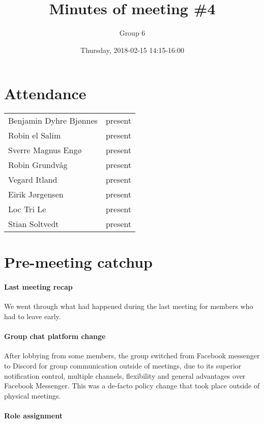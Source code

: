 \documentclass{article}
\title{Minutes of meeting \#4}
\author{Group 6}
\date{Thursday, 2018-02-15 14:15-16:00}
\begin{document}
\maketitle

\section{Attendance}
\begin{tabular}{l l}
    Benjamin Dyhre Bjønnes     & present \\
    Robin el Salim             & present \\
    Sverre Magnus Engø         & present \\
    Robin Grundvåg             & present \\
    Vegard Itland              & present \\
    Eirik Jørgensen            & present \\
    Loc Tri Le                 & present \\
    Stian Soltvedt             & present
\end{tabular}

\section{Pre-meeting catchup}

\paragraph{Last meeting recap}

We went through what had happened during the last meeting for members who had to leave early.

\paragraph{Group chat platform change}

After lobbying from some members, the group switched from Facebook messenger to Discord for group communication outside of meetings, due to its superior notification control, multiple channels, flexibility and general advantages over Facebook Messenger. This was a de-facto policy change that took place outside of physical meetings.

\paragraph{Role assignment}
\end{document}
